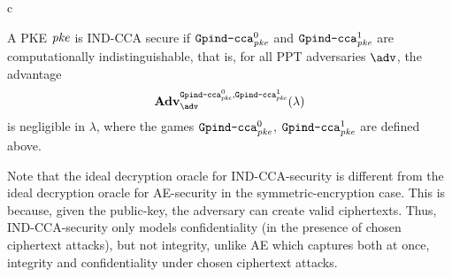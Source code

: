 \begin{security}
\begin{codebox}
\begin{center}
\begin{pchstack}
\begin{pcvstack}
{						\pcreturn c}
					\pcvspace
				\end{pcvstack}
			\end{pchstack}
		\end{center}
	\end{codebox}
	\vspace{5mm}
	A PKE $\mathit{{pke}}$ is IND-CCA secure if $\text{\texttt{Gpind\text{-}cca}}^0_{\mathit{{pke}}}$ and $\text{\texttt{Gpind\text{-}cca}}^1_{\mathit{{pke}}}$ are computationally indistinguishable, that is, for all PPT adversaries $\adv$, the advantage
	\[\mathbf{Adv}_{\adv}^{
		\M{Gpind\text{-}cca}^0_\pke
		,\M{Gpind\text{-}cca}^1_\pke}
		(\lambda) \]
	is negligible in $\lambda$, where the games $\text{\texttt{Gpind\text{-}cca}}^0_{\mathit{{pke}}}$, $\text{\texttt{Gpind\text{-}cca}}^1_{\mathit{{pke}}}$ are defined above.
\end{security}



\begin{remark}
	Note that the ideal decryption oracle for IND-CCA-security is different from the ideal decryption oracle for AE-security in the symmetric-encryption case. This is because, given the public-key, the adversary can create valid ciphertexts. Thus, IND-CCA-security only models confidentiality (in the presence of chosen ciphertext attacks), but not integrity, unlike AE which captures both at once, integrity and confidentiality under chosen ciphertext attacks.
\end{remark}
